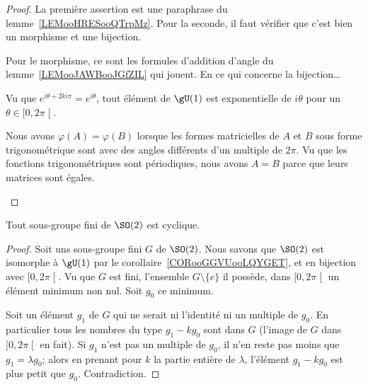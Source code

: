 \begin{proof}
    La première assertion est une paraphrase du lemme~\ref{LEMooHRESooQTrpMz}. Pour la seconde, il faut vérifier que c'est bien un morphisme et une bijection.

    Pour le morphisme, ce sont les formules d'addition d'angle du lemme~\ref{LEMooJAWBooJGfZIL} qui jouent. En ce qui concerne la bijection\ldots

    \begin{subproof}
        \item[Surjection]
            Vu que \(  e^{i\theta+2ki\pi}= e^{i\theta}\), tout élément de \( \gU(1)\) est exponentielle de \( i\theta\) pour un \( \theta\in\mathopen[ 0 , 2\pi \mathclose[\).
        \item[Injection]
            Nous avons \( \varphi(A)=\varphi(B)\) lorsque les formes matricielles de \( A\) et \( B\) sous forme trigonométrique sont avec des angles différents d'un multiple de \( 2\pi\). Vu que les fonctions trigonométriques sont périodiques, nous avons \( A=B\) parce que leurs matrices sont égales.
    \end{subproof}
\end{proof}

\begin{lemma}        \label{LEMooUKEVooAEWvlM}
    Tout sous-groupe fini de \( \SO(2)\) est cyclique.
\end{lemma}

\begin{proof}
    Soit uns sous-groupe fini \(G\) de \( \SO(2)\).  Nous savons que \( \SO(2)\) est isomorphe à \( \gU(1)\) par le corollaire~\ref{CORooGGVUooLQYGET}, et en bijection avec \( \mathopen[ 0 , 2\pi \mathclose[\). Vu que \( G\) est fini, l'ensemble \( G\setminus\{ e \}\) il possède, dans \( \mathopen[ 0 , 2\pi \mathclose[\) un élément minimum non nul. Soit \( g_0\) ce minimum.

        Soit un élément \( g_1\) de \( G\) qui ne serait ni l'identité ni un multiple de \( g_0\). En particulier tous les nombres du type \( g_1-kg_0\) sont dans \( G\) (l'image de \( G\) dans \( \mathopen[ 0 , 2\pi \mathclose[\) en fait). Si \( g_1\) n'est pas un multiple de \( g_0\), il n'en reste pas moins que \( g_1=\lambda g_0\); alors en prenant pour \( k\) la partie entière de \( \lambda\), l'élément \( g_1-kg_0\) est plus petit que \( g_0\). Contradiction.
\end{proof}

